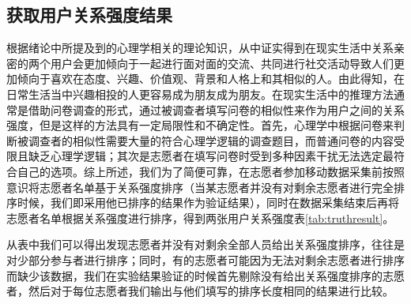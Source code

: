 \subsection{获取用户关系强度结果}
根据绪论中所提及到的心理学相关的理论知识，从中证实得到在现实生活中关系亲密的两个用户会更加倾向于一起进行面对面的交流、共同进行社交活动导致人们更加倾向于喜欢在态度、兴趣、价值观、背景和人格上和其相似的人。由此得知，在日常生活当中兴趣相投的人更容易成为朋友成为朋友。在现实生活中的推理方法通常是借助问卷调查的形式，通过被调查者填写问卷的相似性来作为用户之间的关系强度，但是这样的方法具有一定局限性和不确定性。首先，心理学中根据问卷来判断被调查者的相似性需要大量的符合心理学逻辑的调查题目，而普通问卷的内容受限且缺乏心理学逻辑；其次是志愿者在填写问卷时受到多种因素干扰无法选定最符合自己的选项。综上所述，我们为了简便可靠，在志愿者参加移动数据采集前按照意识将志愿者名单基于关系强度排序（当某志愿者并没有对剩余志愿者进行完全排序时候，我们即采用他已排序的结果作为验证结果），同时在数据采集结束后再将志愿者名单根据关系强度进行排序，得到两张用户关系强度表\ref{tab:truthresult}。
\par 从表中我们可以得出发现志愿者并没有对剩余全部人员给出关系强度排序，往往是对少部分参与者进行排序；同时，有的志愿者可能因为无法对剩余志愿者进行排序而缺少该数据，我们在实验结果验证的时候首先剔除没有给出关系强度排序的志愿者，然后对于每位志愿者我们输出与他们填写的排序长度相同的结果进行比较。
